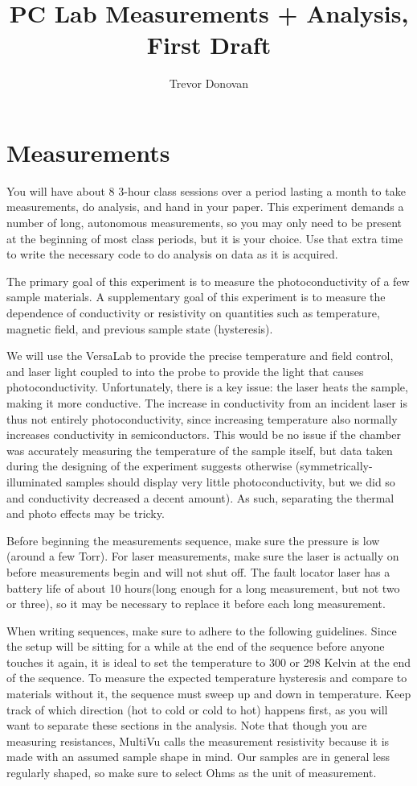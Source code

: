 \documentclass{article}
\title{PC Lab Measurements + Analysis, First Draft}
\author{Trevor Donovan}
\date{}
\begin{document}
\maketitle

\section*{Measurements}

You will have about 8 3-hour class sessions over a period lasting a month to take measurements, do analysis, and hand in your paper. This experiment demands a number of long, autonomous measurements, so you may only need to be present at the beginning of most class periods, but it is your choice. Use that extra time to write the necessary code to do analysis on data as it is acquired.

The primary goal of this experiment is to measure the photoconductivity of a few sample materials. A supplementary goal of this experiment is to measure the dependence of conductivity or resistivity on quantities such as temperature, magnetic field, and previous sample state (hysteresis).

We will use the VersaLab to provide the precise temperature and field control, and laser light coupled to into the probe to provide the light that causes photoconductivity. Unfortunately, there is a key issue: the laser heats the sample, making it more conductive. The increase in conductivity from an incident laser is thus not entirely photoconductivity, since increasing temperature also normally increases conductivity in semiconductors. This would be no issue if the chamber was accurately measuring the temperature of the sample itself, but data taken during the designing of the experiment suggests otherwise (symmetrically-illuminated samples should display very little photoconductivity, but we did so and conductivity decreased a decent amount). As such, separating the thermal and photo effects may be tricky.

Before beginning the measurements sequence, make sure the pressure is low (around a few Torr). For laser measurements, make sure the laser is actually on before measurements begin and will not shut off. The fault locator laser has a battery life of about 10 hours(long enough for a long measurement, but not two or three), so it may be necessary to replace it before each long measurement.

When writing sequences, make sure to adhere to the following guidelines. Since the setup will be sitting for a while at the end of the sequence before anyone touches it again, it is ideal to set the temperature to 300 or 298 Kelvin at the end of the sequence. To measure the expected temperature hysteresis and compare to materials without it, the sequence must sweep up and down in temperature. Keep track of which direction (hot to cold or cold to hot) happens first, as you will want to separate these sections in the analysis. Note that though you are measuring resistances, MultiVu calls the measurement resistivity because it is made with an assumed sample shape in mind. Our samples are in general less regularly shaped, so make sure to select Ohms as the unit of measurement.
\end{document}
